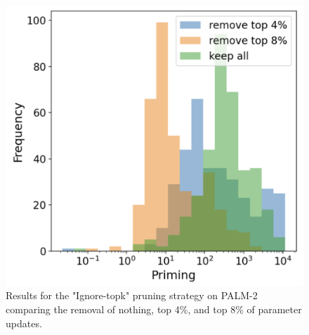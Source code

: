 \documentclass[11pt, a4paper, logo, copyright]{googledeepmind}
\theoremstyle{plain}
\theoremstyle{definition}
\theoremstyle{remark}
\begin{document}
\begin{figure}[h]
\vspace{0mm}
    \centering \includegraphics[scale=.30,clip]{figures/4v8_prune.png}
    \vspace{-1mm}
    \caption{Results for the "Ignore-topk" pruning strategy on PALM-2 comparing the removal of nothing, top 4\%, and top 8\% of parameter updates.} \label{fig:4v8_prune}
  \vspace{-0mm}
\end{figure}
\end{document}

